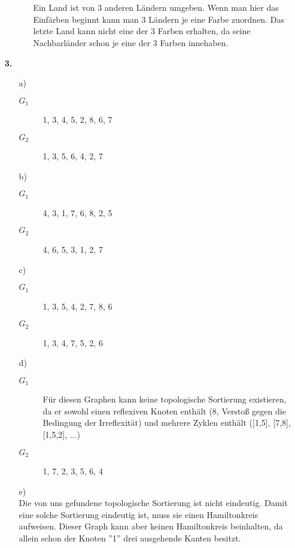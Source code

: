 \documentclass[a4paper,11pt,ngerman]{scrartcl}
\begin{document}
\begin{enumerate}
\begin{enumerate}
\begin{enumerate}
 \\ \\
					Ein Land ist von 3 anderen Ländern umgeben. Wenn man hier das Einfärben beginnt kann man 3 
					Ländern je eine Farbe zuordnen. Das letzte Land kann nicht eine der 3 Farben erhalten,
					da seine Nachbarländer schon je eine der 3 Farben innehaben.					
			\end{enumerate}
		\end{enumerate}
		\item[\textbf{3.}]
		\begin{enumerate}
			\item[a)]\quad
			\begin{description}
				\item[$G_1$] 1, 3, 4, 5, 2, 8, 6, 7
				\item[$G_2$] 1, 3, 5, 6, 4, 2, 7
			\end{description}
			\item[b)]\quad
			\begin{description}
				\item[$G_1$] 4, 3, 1, 7, 6, 8, 2, 5
				\item[$G_2$] 4, 6, 5, 3, 1, 2, 7
			\end{description}
			\item[c)]\quad
			\begin{description}
				\item[$G_1$] 1, 3, 5, 4, 2, 7, 8, 6
				\item[$G_2$] 1, 3, 4, 7, 5, 2, 6
			\end{description}
			\item[d)]\quad
			\begin{description}
				\item[$G_1$] Für diesen Graphen kann keine topologische Sortierung existieren, da er sowohl einen reflexiven Knoten enthält (8, Verstoß gegen die Bedingung der Irreflexität) und mehrere Zyklen enthält ([1,5], [7,8], [1,5,2], ...)
				\item[$G_2$] 1, 7, 2, 3, 5, 6, 4
			\end{description}
			\item[e)]\quad \\
				Die von uns gefundene topologische Sortierung ist nicht eindeutig. Damit eine solche Sortierung eindeutig ist, muss sie einen Hamiltonkreis aufweisen. Dieser Graph kann aber keinen Hamiltonkreis beinhalten, da allein schon der Knoten ''1'' drei ausgehende Kanten besitzt.

\end{enumerate}
\end{enumerate}
\end{document}
